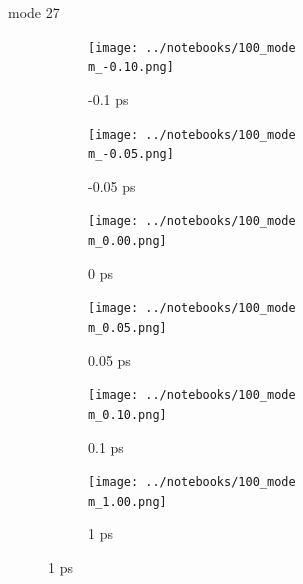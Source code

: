 \documentclass{beamer}
\newcommand\w{0.32}
\begin{document}
\renewcommand\m{27}
\begin{frame}{mode \m}
	\begin{figure}
		\centering
		\begin{subfigure}[b]{\w\textwidth}
			\centering
			\texttt{[image: ../notebooks/100\_mode\\m\_-0.10.png]}
			\caption{-0.1 ps}
		\end{subfigure}
		\begin{subfigure}[b]{\w\textwidth}
			\centering
			\texttt{[image: ../notebooks/100\_mode\\m\_-0.05.png]}
			\caption{-0.05 ps}
		\end{subfigure}
		\begin{subfigure}[b]{\w\textwidth}
			\centering
			\texttt{[image: ../notebooks/100\_mode\\m\_0.00.png]}
			\caption{0 ps}
		\end{subfigure}
		\begin{subfigure}[b]{\w\textwidth}
			\centering
			\texttt{[image: ../notebooks/100\_mode\\m\_0.05.png]}
			\caption{0.05 ps}
		\end{subfigure}
		\begin{subfigure}[b]{\w\textwidth}
			\centering
			\texttt{[image: ../notebooks/100\_mode\\m\_0.10.png]}
			\caption{0.1 ps}
		\end{subfigure}
		\begin{subfigure}[b]{\w\textwidth}
			\centering
			\texttt{[image: ../notebooks/100\_mode\\m\_1.00.png]}
			\caption{1 ps}
		\end{subfigure}
	\end{figure}
\end{frame}
\end{document}

